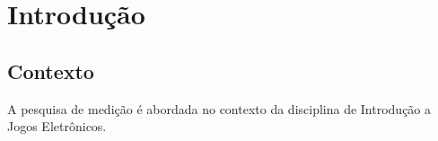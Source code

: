 \chapter{Introdução}

\section{Contexto}
	
	A pesquisa de medição é abordada no contexto da disciplina de Introdução a Jogos Eletrônicos.

  
